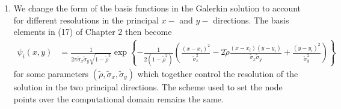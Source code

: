 \documentclass[10pt]{article}
\begin{document}
\begin{enumerate}
\item
  We change the form of the basis functions in the Galerkin solution
  to account for different resolutions in the principal $x-$ and $y-$
  directions. The basis elements in (17) of Chapter 2 then become
  \begin{align}
    \psi_i(x,y) &= \frac{1}{2\pi \tilde{\sigma}_x \tilde{\sigma}_y \sqrt{1-\tilde{\rho}^2}}  \exp\left\{ -\frac{1}{2(1-\tilde{\rho}^2)} \left( \frac{(x - x_i)^2}{\tilde{\sigma}_x^2} - 2\tilde{\rho} \frac{(x-x_i)(y-y_i)}{\tilde{\sigma}_x\tilde{\sigma}_y} +  \frac{(y - y_i)^2}{\tilde{\sigma}_y^2}  \right)  \right\}
\end{align}
for some parameters
$(\tilde{\rho}, \tilde{\sigma}_x, \tilde{\sigma}_y)$ which together
control the resolution of the solution in the two principal
directions. The scheme used to set the node points over the
computational domain remains the same.


\end{enumerate}
\end{document}
